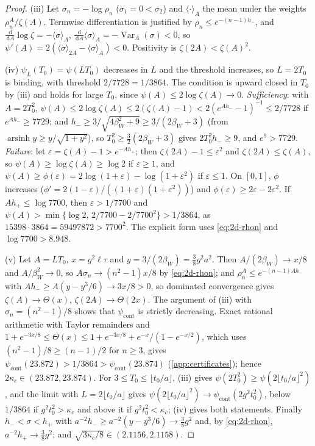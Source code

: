 \documentclass[11pt,a4paper]{amsart}
\theoremstyle{definition}
\theoremstyle{remark}
\numberwithin{equation}{section}
\DeclareMathOperator{\Var}{Var}      %
\newcommand{\dd}{\,\mathrm{d}}             %
\newcommand{\psiT}[2]{\psi_{#1}(#2)}       %
\newcommand{\tzero}{t_0}                   %
\newcommand{\Tzero}{T_0}                   %
\newcommand{\betaW}{\beta_{W}}             %
\begin{document}
\begin{proof}
(iii) Let $\sigma_n=-\log\rho_n$ ($\sigma_1=0<\sigma_2$) and $\langle\cdot\rangle_A$ the mean under the weights $\rho_n^A/\zeta(A)$. Termwise differentiation is justified by $\rho_n\le e^{-(n-1)h_-}$, and $\frac{\dd}{\dd A}\log\zeta=-\langle\sigma\rangle_A$, $\frac{\dd}{\dd A}\langle\sigma\rangle_A=-\Var_A(\sigma)<0$, so $\psi'(A)=2(\langle\sigma\rangle_{2A}-\langle\sigma\rangle_A)<0$. Positivity is $\zeta(2A)<\zeta(A)^2$.

(iv) $\psiT{L}{\Tzero}=\psi(L\Tzero)$ decreases in $L$ and the threshold increases, so $L=2\Tzero$ is binding, with threshold $2/7728=1/3864$. The condition is upward closed in $\Tzero$ by (iii) and holds for large $\Tzero$, since $\psi(A)\le2\log\zeta(A)\to0$. \emph{Sufficiency}: with $A=2\Tzero^2$, $\psi(A)\le2\log\zeta(A)\le2(\zeta(A)-1)<2(e^{Ah_-}-1)^{-1}\le2/7728$ if $e^{Ah_-}\ge7729$; and $h_-\ge3/\sqrt{4\betaW^2+9}\ge3/(2\betaW+3)$ (from $\operatorname{arsinh}y\ge y/\sqrt{1+y^2}$), so $\Tzero^2\ge\frac32(2\betaW+3)$ gives $2\Tzero^2h_-\ge9$, and $e^9>7729$. \emph{Failure}: let $\varepsilon=\zeta(A)-1>e^{-Ah_+}$; then $\zeta(2A)-1\le\varepsilon^2$ and $\zeta(2A)\le\zeta(A)$, so $\psi(A)\ge\log\zeta(A)\ge\log2$ if $\varepsilon\ge1$, and $\psi(A)\ge\phi(\varepsilon)=2\log(1+\varepsilon)-\log(1+\varepsilon^2)$ if $\varepsilon\le1$. On $[0,1]$, $\phi$ increases ($\phi'=2(1-\varepsilon)/((1+\varepsilon)(1+\varepsilon^2))$) and $\phi(\varepsilon)\ge2\varepsilon-2\varepsilon^2$. If $Ah_+\le\log7700$, then $\varepsilon>1/7700$ and $\psi(A)>\min\{\log2,\,2/7700-2/7700^2\}>1/3864$, as $15398\cdot3864=59497872>7700^2$. The explicit form uses \eqref{eq:2d-rhon} and $\log7700>8.948$.

(v) Let $A=L\Tzero$, $x=g^2\ell\tau$ and $y=3/(2\betaW)=\frac38g^2a^2$. Then $A/(2\betaW)\to x/8$ and $A/\betaW^2\to0$, so $A\sigma_n\to(n^2-1)x/8$ by \eqref{eq:2d-rhon}; and $\rho_n^A\le e^{-(n-1)Ah_-}$ with $Ah_-\ge A(y-y^3/6)\to3x/8>0$, so dominated convergence gives $\zeta(A)\to\Theta(x)$, $\zeta(2A)\to\Theta(2x)$. The argument of (iii) with $\sigma_n=(n^2-1)/8$ shows that $\psi_{\mathrm{cont}}$ is strictly decreasing. Exact rational arithmetic with Taylor remainders and $1+e^{-3x/8}\le\Theta(x)\le1+e^{-3x/8}+e^{-x}/(1-e^{-x/2})$, which uses $(n^2-1)/8\ge(n-1)/2$ for $n\ge3$, gives $\psi_{\mathrm{cont}}(23.872)>1/3864>\psi_{\mathrm{cont}}(23.874)$ (\cref{app:certificates}); hence $2\kappa_c\in(23.872,23.874)$. For $3\le\Tzero\le\lfloor\tzero/a\rfloor$, (iii) gives $\psi(2\Tzero^2)\ge\psi(2\lfloor\tzero/a\rfloor^2)$, and the limit with $L=2\lfloor\tzero/a\rfloor$ gives $\psi(2\lfloor\tzero/a\rfloor^2)\to\psi_{\mathrm{cont}}(2g^2\tzero^2)$, below $1/3864$ if $g^2\tzero^2>\kappa_c$ and above it if $g^2\tzero^2<\kappa_c$; (iv) gives both statements. Finally $h_-<\sigma<h_+$ with $a^{-2}h_-\ge a^{-2}(y-y^3/6)\to\frac38g^2$ and, by \eqref{eq:2d-rhon}, $a^{-2}h_+\to\frac38g^2$; and $\sqrt{3\kappa_c/8}\in(2.1156,2.1158)$.
\end{proof}
\end{document}
